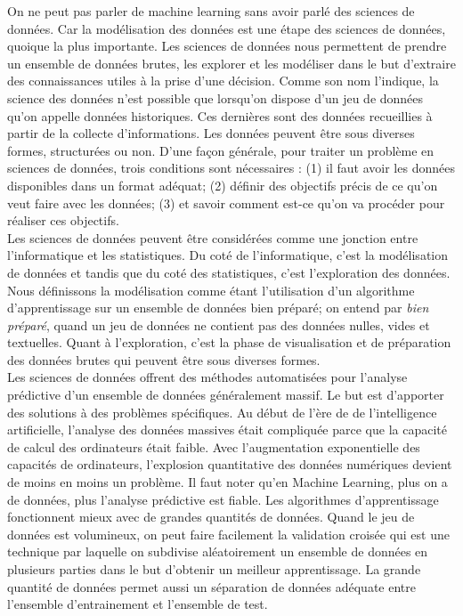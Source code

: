 \documentclass[12pt, french]{report}
\begin{document}
On ne peut pas parler de machine learning sans avoir parlé des sciences de données. Car la modélisation des données est une étape des sciences de données, quoique la plus importante. Les sciences de données nous permettent de prendre un ensemble de données brutes, les explorer et les modéliser dans le but d'extraire des connaissances utiles à la prise d'une décision. Comme son nom l'indique, la science des données n'est possible que lorsqu'on dispose d'un jeu de données qu'on appelle données historiques. Ces dernières sont des données recueillies à partir de la collecte d'informations. Les données peuvent être sous diverses formes, structurées ou non. D'une façon générale, pour traiter un problème en sciences de données, trois conditions sont nécessaires : (1) il faut avoir les données disponibles dans un format adéquat; (2) définir des objectifs précis de ce qu'on veut faire avec les données; (3) et savoir comment est-ce qu'on va procéder pour réaliser ces objectifs. \\

Les sciences de données peuvent être considérées comme une jonction entre l'informatique et les statistiques. Du coté de l'informatique, c'est la modélisation de données et tandis que du coté des statistiques, c'est l'exploration des données. Nous définissons la modélisation comme étant l'utilisation d'un algorithme d'apprentissage sur un ensemble de données bien préparé; on entend par \textit{bien préparé}, quand un jeu de données ne contient pas des données nulles, vides et textuelles.  Quant à l'exploration,  c'est la phase de visualisation et de préparation des données brutes qui peuvent être sous diverses formes. \\

Les sciences de données offrent des méthodes automatisées pour l'analyse prédictive d'un ensemble de données généralement massif. Le but est d'apporter des solutions à des problèmes spécifiques. Au début de l'ère de de l'intelligence artificielle, l'analyse des données massives était compliquée parce que la capacité de calcul des ordinateurs était faible. Avec l'augmentation exponentielle des capacités de ordinateurs, l'explosion quantitative des données numériques devient de moins en moins un problème. Il faut noter qu'en Machine Learning, plus on a de données, plus l'analyse prédictive est fiable. Les algorithmes d'apprentissage fonctionnent mieux avec de grandes quantités de données. Quand le jeu de données est volumineux, on peut faire facilement la validation croisée qui est une technique par laquelle on subdivise aléatoirement un ensemble de données en plusieurs parties dans le but d'obtenir un meilleur apprentissage. La grande quantité de données permet aussi un séparation de données adéquate entre l'ensemble d'entrainement et l'ensemble de test.\\  
\end{document}
